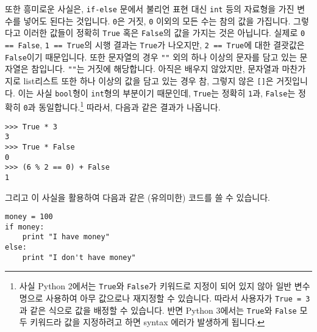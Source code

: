 \documentclass[../main.tex]{subfiles}
\begin{document}
또한 흥미로운 사실은, \texttt{if-else} 문에서 불리언 표현 대신 \texttt{int} 등의 자료형을 가진 변수를 넣어도 된다는 것입니다.
\texttt{0}은 거짓, \texttt{0} 이외의 모든 수는 참의 값을 가집니다.
그렇다고 이러한 값들이 정확히 \texttt{True} 혹은 \texttt{False}의 값을 가지는 것은 아닙니다.
실제로 \texttt{0 == False}, \texttt{1 == True}의 시행 결과는 \texttt{True}가 나오지만, \texttt{2 == True}에 대한 결괏값은 \texttt{False}이기 때문입니다.
또한 문자열의 경우 \texttt{""} 외의 하나 이상의 문자를 담고 있는 문자열은 참입니다.
\texttt{""}는 거짓에 해당합니다.
아직은 배우지 않았지만, 문자열과 마찬가지로 list리스트 또한 하나 이상의 값을 담고 있는 경우 참, 그렇지 않은 \texttt{[]}은 거짓입니다.
이는 사실 \texttt{bool}형이 \texttt{int}형의 부분이기 때문인데, \texttt{True}는 정확히 \texttt{1}과, \texttt{False}는 정확히 \texttt{0}과 동일합니다.\footnote{사실 Python 2에서는 \texttt{True}와 \texttt{False}가 키워드로 지정이 되어 있지 않아 일반 변수명으로 사용하여 아무 값으로나 재지정할 수 있습니다. 따라서 사용자가 \texttt{True = 3}과 같은 식으로 값을 배정할 수 있습니다. 반면 Python 3에서는 \texttt{True}와 \texttt{False} 모두 키워드라 값을 지정하려고 하면 syntax 에러가 발생하게 됩니다.}
따라서, 다음과 같은 결과가 나옵니다.
\begin{verbatim}
>>> True * 3
3
>>> True * False
0
>>> (6 % 2 == 0) + False
1
\end{verbatim}
그리고 이 사실을 활용하여 다음과 같은 (유의미한) 코드를 쓸 수 있습니다.
\begin{verbatim}
money = 100
if money:
	print "I have money"
else:
	print "I don't have money"
\end{verbatim}
\end{document}

